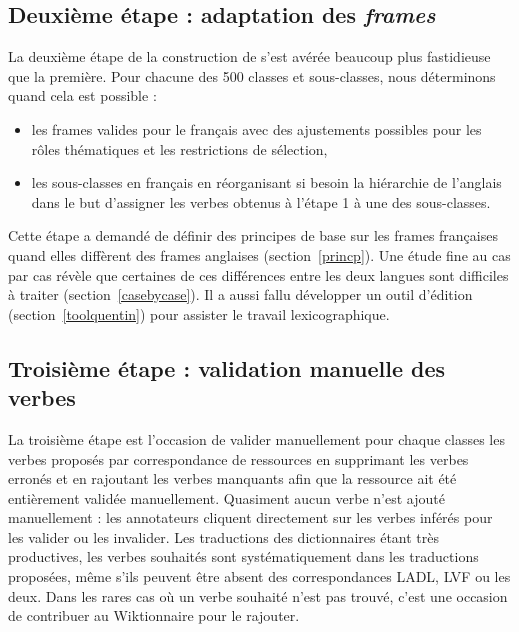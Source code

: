 
\subsection{Deuxième étape : adaptation des \emph{frames}}\label{second}

La deuxième étape de la construction de \verbenet{} s'est avérée beaucoup plus
fastidieuse que la première. Pour chacune des 500 classes et sous-classes, nous
déterminons quand cela est possible :

\begin{itemize}

    \item les frames valides pour le français avec des ajustements possibles
        pour les rôles thématiques et les restrictions de sélection,

    \item les sous-classes en français en réorganisant si besoin la hiérarchie
        de l'anglais dans le but d'assigner les verbes obtenus à l'étape 1 à
        une des sous-classes.

\end{itemize}

Cette étape a demandé de définir des principes de base sur les frames
françaises quand elles diffèrent des frames anglaises (section~\ref{princp}).
Une étude fine au cas par cas révèle que certaines de ces différences entre les
deux langues sont difficiles à traiter (section~\ref{casebycase}). Il a aussi
fallu développer un outil d'édition (section~\ref{toolquentin}) pour assister
le travail lexicographique. 

\subsection{Troisième étape : validation manuelle des verbes}
\label{third}

La troisième étape est l'occasion de valider manuellement pour chaque classes
les verbes proposés par correspondance de ressources en supprimant les verbes
erronés et en rajoutant les verbes manquants afin que la ressource ait été
entièrement validée manuellement. Quasiment aucun verbe n'est ajouté
manuellement : les annotateurs cliquent directement sur les verbes inférés pour
les valider ou les invalider.  Les traductions des dictionnaires étant très
productives, les verbes souhaités sont systématiquement dans les traductions
proposées, même s'ils peuvent être absent des correspondances LADL, LVF ou les
deux. Dans les rares cas où un verbe souhaité n'est pas trouvé, c'est une
occasion de contribuer au Wiktionnaire pour le rajouter.

